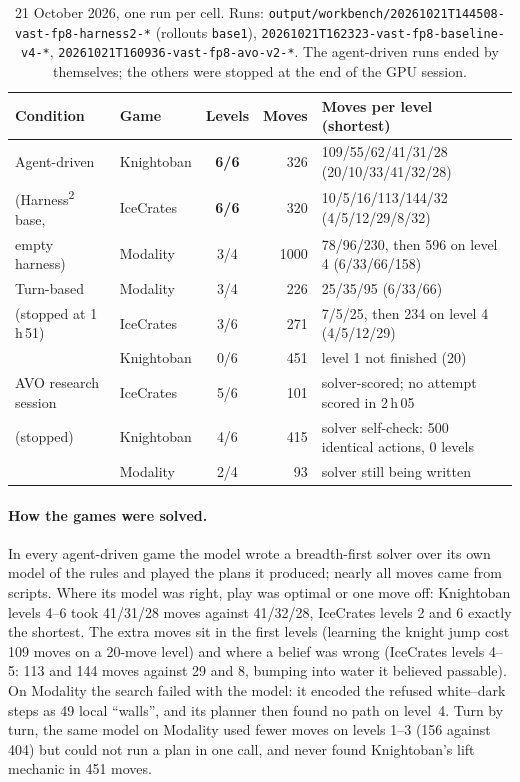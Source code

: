 \documentclass[11pt,a4paper]{article}
\newcommand{\hsq}{Harness\textsuperscript{2}}
\begin{document}
\begin{table}[htbp]
  \centering\small
  \begin{tabularx}{\linewidth}{l l c r Y}
    \toprule
    Condition & Game & Levels & Moves & Moves per level (shortest) \\
    \midrule
    Agent-driven & Knightoban & \textbf{6/6} & 326 & 109/55/62/41/31/28 (20/10/33/41/32/28) \\
    (\hsq{} base, & IceCrates & \textbf{6/6} & 320 & 10/5/16/113/144/32 (4/5/12/29/8/32) \\
    empty harness) & Modality & 3/4 & 1000 & 78/96/230, then 596 on level 4 (6/33/66/158) \\
    \midrule
    Turn-based & Modality & 3/4 & 226 & 25/35/95 (6/33/66) \\
    (stopped at 1\,h\,51) & IceCrates & 3/6 & 271 & 7/5/25, then 234 on level 4 (4/5/12/29) \\
    & Knightoban & 0/6 & 451 & level 1 not finished (20) \\
    \midrule
    AVO research session & IceCrates & 5/6 & 101 & solver-scored; no attempt scored in 2\,h\,05 \\
    (stopped) & Knightoban & 4/6 & 415 & solver self-check: 500 identical actions, 0 levels \\
    & Modality & 2/4 & 93 & solver still being written \\
    \bottomrule
  \end{tabularx}
  \caption{21 October 2026, one run per cell. Runs:
  \texttt{output/workbench/20261021T144508-vast-fp8-harness2-*}
  (rollouts \texttt{base1}), \texttt{20261021T162323-vast-fp8-baseline-v4-*},
  \texttt{20261021T160936-vast-fp8-avo-v2-*}. The agent-driven runs ended by
  themselves; the others were stopped at the end of the GPU session.}
  \label{tab:main}
\end{table}

\paragraph{How the games were solved.}
In every agent-driven game the model wrote a breadth-first solver over its
own model of the rules and played the plans it produced; nearly all moves
came from scripts. Where its model was right, play was optimal or one move
off: Knightoban levels 4--6 took 41/31/28 moves against 41/32/28, IceCrates
levels 2 and 6 exactly the shortest. The extra moves sit in the first levels
(learning the knight jump cost 109 moves on a 20-move level) and where a
belief was wrong (IceCrates levels 4--5: 113 and 144 moves against 29 and 8,
bumping into water it believed passable). On Modality the search failed with
the model: it encoded the refused white--dark steps as 49 local ``walls'',
and its planner then found no path on level~4. Turn by turn, the same model
on Modality used fewer moves on levels 1--3 (156 against 404) but could not
run a plan in one call, and never found Knightoban's lift mechanic in 451
moves.
\end{document}
